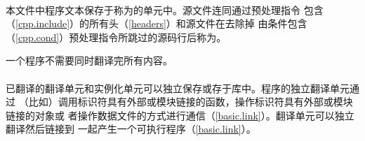 \paragraph{} %
本文件中程序文本保存于称为的单元中。源文件连同通过预处理指令
包含（\ref{cpp.include}）的所有头（\ref{headers}）和源文件在去除掉
由条件包含（\ref{cpp.cond}）预处理指令所跳过的源码行后称为。

\begin{note}
一个\cpp{}程序不需要同时翻译完所有内容。
\end{note}

\paragraph{} %
\begin{note}
已翻译的翻译单元和实例化单元可以独立保存或存于库中。程序的独立翻译单元通过
（比如）调用标识符具有外部或模块链接的函数，操作标识符具有外部或模块链接的对象或
者操作数据文件的方式进行通信（\ref{basic.link}）。翻译单元可以独立翻译然后链接到
一起产生一个可执行程序（\ref{basic.link}）。
\end{note}
